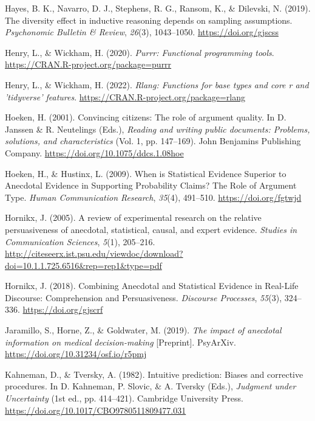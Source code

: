 \documentclass[
  man, donotrepeattitle,floatsintext]{apa7}
\newlength{\cslhangindent}
\newlength{\cslentryspacingunit} %
\newenvironment{CSLReferences}[2] %
 {%
  \setlength{\parindent}{0pt}
  \ifodd #1
  \let\oldpar\par
  \def\par{\hangindent=\cslhangindent\oldpar}
  \fi
  \setlength{\parskip}{#2\cslentryspacingunit}
 }%
 {}
\theoremstyle{definition}
\theoremstyle{definition}
\theoremstyle{definition}
\theoremstyle{definition}
\theoremstyle{remark}
\begin{document}
\begin{CSLReferences}{1}{0}
\leavevmode{}%
Hayes, B. K., Navarro, D. J., Stephens, R. G., Ransom, K., \& Dilevski, N. (2019). The diversity effect in inductive reasoning depends on sampling assumptions. \emph{Psychonomic Bulletin \& Review}, \emph{26}(3), 1043--1050. \url{https://doi.org/gjscss}

\leavevmode{}%
Henry, L., \& Wickham, H. (2020). \emph{Purrr: Functional programming tools}. \url{https://CRAN.R-project.org/package=purrr}

\leavevmode{}%
Henry, L., \& Wickham, H. (2022). \emph{Rlang: Functions for base types and core r and 'tidyverse' features}. \url{https://CRAN.R-project.org/package=rlang}

\leavevmode{}%
Hoeken, H. (2001). Convincing citizens: {The} role of argument quality. In D. Janssen \& R. Neutelings (Eds.), \emph{Reading and writing public documents: Problems, solutions, and characteristics} (Vol. 1, pp. 147--169). {John Benjamins Publishing Company}. \url{https://doi.org/10.1075/ddcs.1.08hoe}

\leavevmode{}%
Hoeken, H., \& Hustinx, L. (2009). When is {Statistical Evidence Superior} to {Anecdotal Evidence} in {Supporting Probability Claims}? {The Role} of {Argument Type}. \emph{Human Communication Research}, \emph{35}(4), 491--510. \url{https://doi.org/fgtwjd}

\leavevmode{}%
Hornikx, J. (2005). A review of experimental research on the relative persuasiveness of anecdotal, statistical, causal, and expert evidence. \emph{Studies in Communication Sciences}, \emph{5}(1), 205--216. \url{http://citeseerx.ist.psu.edu/viewdoc/download?doi=10.1.1.725.6516\&rep=rep1\&type=pdf}

\leavevmode{}%
Hornikx, J. (2018). Combining {Anecdotal} and {Statistical Evidence} in {Real-Life Discourse}: {Comprehension} and {Persuasiveness}. \emph{Discourse Processes}, \emph{55}(3), 324--336. \url{https://doi.org/gjscrf}

\leavevmode{}%
Jaramillo, S., Horne, Z., \& Goldwater, M. (2019). \emph{The impact of anecdotal information on medical decision-making} {[}Preprint{]}. {PsyArXiv}. \url{https://doi.org/10.31234/osf.io/r5pmj}

\leavevmode{}%
Kahneman, D., \& Tversky, A. (1982). Intuitive prediction: {Biases} and corrective procedures. In D. Kahneman, P. Slovic, \& A. Tversky (Eds.), \emph{Judgment under {Uncertainty}} (1st ed., pp. 414--421). {Cambridge University Press}. \url{https://doi.org/10.1017/CBO9780511809477.031}


\end{CSLReferences}
\end{document}
